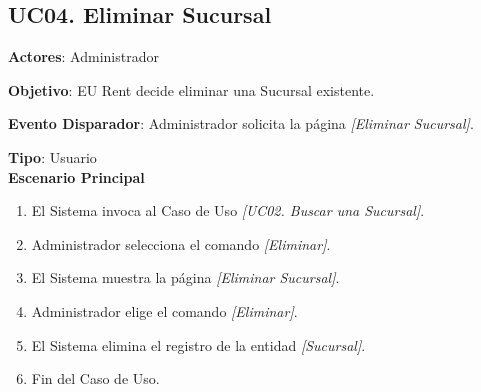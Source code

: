 \subsection{UC04. Eliminar Sucursal} \label{EliminarSucursal}
\textbf{Actores}: Administrador

\textbf{Objetivo}: EU Rent decide eliminar una Sucursal existente.

\textbf{Evento Disparador}: Administrador solicita la página \textit{[Eliminar Sucursal]}.

\textbf{Tipo}: Usuario\\

\textbf{Escenario Principal}

\begin{enumerate}
\item El Sistema invoca al Caso de Uso \textit{[UC02. Buscar una Sucursal]}.
\item Administrador selecciona el comando \textit{[Eliminar]}.
\item El Sistema muestra la página \textit{[Eliminar Sucursal]}.
\item Administrador elige el comando \textit{[Eliminar]}.
\item El Sistema elimina el registro de la entidad \textit{[Sucursal]}.
\item Fin del Caso de Uso.
\end{enumerate}
